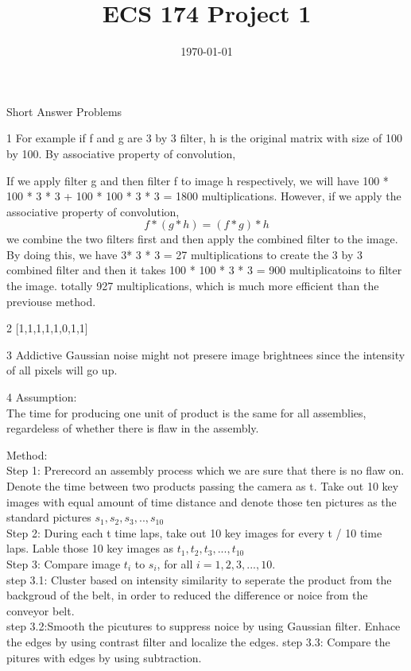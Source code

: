 \documentclass[a4paper,12pt]{article}
\title{ECS 174 Project 1}
\date{\today}
\begin{document}
\maketitle
\begin{section}{Short Answer Problems}
\begin{subsection}{1}
For example if f and g are 3 by 3 filter, h is the original matrix with size of 100 by 100. By associative property of convolution, 


If we apply filter g and then filter f to image h respectively, we will have 100 * 100 * 3 * 3  + 100 * 100 * 3 * 3  = 1800 multiplications. However, if we apply the associative property of convolution, 
$$ f * (g * h) = (f * g) * h $$
we combine the two filters first and then apply the combined filter to the image. By doing this, we have 3* 3 * 3 = 27 multiplications to create the 3 by 3 combined filter and then it takes 100 * 100 * 3 * 3 = 900 multiplicatoins to filter the image. totally 927 multiplications, which is much more efficient than the previouse method. 

\end{subsection}

\begin{subsection}{2}
[1,1,1,1,1,0,1,1]

\end{subsection}

\begin{subsection}{3}
Addictive Gaussian noise might not presere image brightnees since the intensity of all pixels will go up. 

\end{subsection}

\begin{subsection}{4}
Assumption:\\
The time for producing one unit of product is the same for all assemblies, regardeless of whether there is flaw in the assembly. 

Method:\\
Step 1: Prerecord an assembly process which we are sure that there is no flaw on. Denote the time between two products passing the camera as t. Take out 10 key images with equal amount of time distance and denote those ten pictures as the standard pictures $s_1,s_2, s_3,..,s_10$\\
Step 2: During each t time laps, take out 10 key images for every t / 10 time laps. Lable those 10 key images as $t_1,t_2,t_3,...,t_10$\\

Step 3: Compare image $t_i$ to $s_i$, for all $i = 1, 2,3,...,10$.\\
step 3.1: Cluster based on intensity similarity to seperate the product from the backgroud of the belt, in order to reduced the difference or noice from the conveyor belt. \\
step 3.2:Smooth the picutures to suppress noice by using Gaussian filter. Enhace the edges by using contrast filter and localize the edges.
step 3.3: Compare the pitures with edges by using subtraction.\\


\end{subsection}

\end{section}
\end{document}
